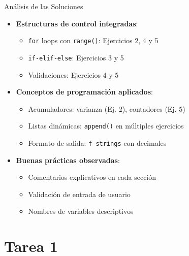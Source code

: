 \documentclass[10pt]{beamer}
\begin{document}
\begin{frame}{Análisis de las Soluciones}
  \begin{itemize}
    \item \textbf{Estructuras de control integradas}:
      \begin{itemize}
        \item \texttt{for} loops con \texttt{range()}: Ejercicios 2, 4 y 5
        \item \texttt{if-elif-else}: Ejercicios 3 y 5
        \item Validaciones: Ejercicios 4 y 5
      \end{itemize}
    \item \textbf{Conceptos de programación aplicados}:
      \begin{itemize}
        \item Acumuladores: varianza (Ej. 2), contadores (Ej. 5)
        \item Listas dinámicas: \texttt{append()} en múltiples ejercicios
        \item Formato de salida: \texttt{f-strings} con decimales
      \end{itemize}
    \item \textbf{Buenas prácticas observadas}:
      \begin{itemize}
        \item Comentarios explicativos en cada sección
        \item Validación de entrada de usuario
        \item Nombres de variables descriptivos
      \end{itemize}
  \end{itemize}
\end{frame}


\section{Tarea 1}
\end{document}
